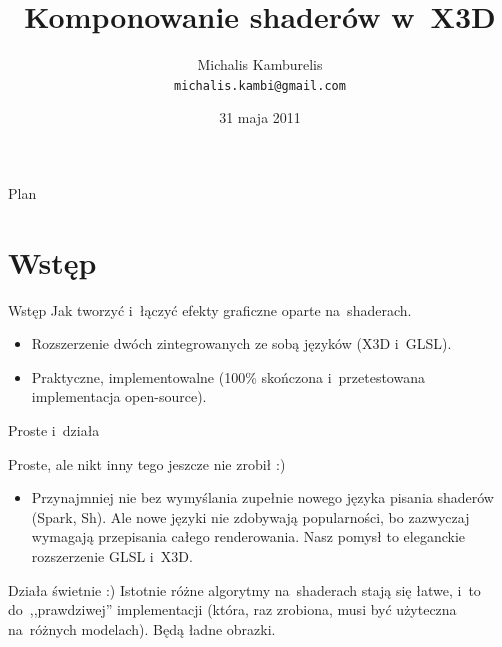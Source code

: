 \documentclass{beamer}
\title{Komponowanie shaderów w~X3D}
\author[Michalis Kamburelis]{Michalis Kamburelis \\ \texttt{michalis.kambi@gmail.com}}
\date{31 maja 2011}
\begin{document}
{
  \begin{frame}
    \titlepage
  \end{frame}
}

\begin{frame}{Plan}
  \tableofcontents
\end{frame}

\section{Wstęp}

\begin{frame}{Wstęp}
Jak tworzyć i~łączyć efekty graficzne oparte na~shaderach.

\begin{itemize}
  \item Rozszerzenie dwóch zintegrowanych ze sobą języków (X3D i~GLSL).
  \item Praktyczne, implementowalne (100\% skończona
    i~przetestowana implementacja open-source).
\end{itemize}
\end{frame}

\begin{frame}{Proste i~działa}

Proste, ale nikt inny tego jeszcze nie zrobił :)

\begin{itemize}
  \item Przynajmniej nie bez wymyślania zupełnie nowego języka pisania shaderów
    (Spark, Sh). Ale nowe języki nie zdobywają popularności,
    bo zazwyczaj wymagają przepisania całego renderowania.
    Nasz pomysł to eleganckie rozszerzenie GLSL i~X3D.
\end{itemize}

Działa świetnie :) Istotnie różne algorytmy na~shaderach stają się łatwe,
i~to do~,,prawdziwej'' implementacji (która, raz zrobiona,
musi być użyteczna na~różnych modelach).
Będą ładne obrazki.


\end{frame}
\end{document}
